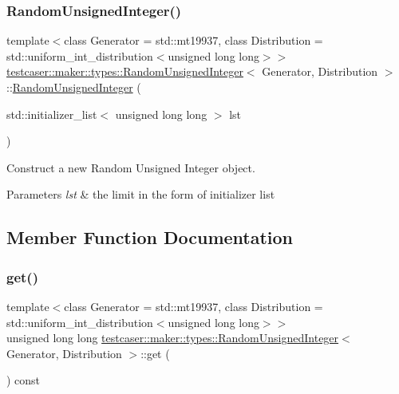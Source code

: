 \subsubsection{\texorpdfstring{RandomUnsignedInteger()}{RandomUnsignedInteger()}\hspace{0.1cm}{\footnotesize\ttfamily [3/3]}}
{\footnotesize\ttfamily template$<$class Generator = std\+::mt19937, class Distribution = std\+::uniform\+\_\+int\+\_\+distribution$<$unsigned long long$>$$>$ \\
\mbox{\hyperlink{classtestcaser_1_1maker_1_1types_1_1RandomUnsignedInteger}{testcaser\+::maker\+::types\+::\+Random\+Unsigned\+Integer}}$<$ Generator, Distribution $>$\+::\mbox{\hyperlink{classtestcaser_1_1maker_1_1types_1_1RandomUnsignedInteger}{Random\+Unsigned\+Integer}} (\begin{DoxyParamCaption}\item[{std\+::initializer\+\_\+list$<$ unsigned long long $>$}]{lst }\end{DoxyParamCaption})\hspace{0.3cm}{\ttfamily [inline]}}



Construct a new Random Unsigned Integer object. 


\begin{DoxyParams}{Parameters}
{\em lst} & the limit in the form of initializer list \\
\hline
\end{DoxyParams}


\subsection{Member Function Documentation}
\mbox{\label{classtestcaser_1_1maker_1_1types_1_1RandomUnsignedInteger_a73504939f740445d56b0bd00257f5480}} 
\subsubsection{\texorpdfstring{get()}{get()}}
{\footnotesize\ttfamily template$<$class Generator = std\+::mt19937, class Distribution = std\+::uniform\+\_\+int\+\_\+distribution$<$unsigned long long$>$$>$ \\
unsigned long long \mbox{\hyperlink{classtestcaser_1_1maker_1_1types_1_1RandomUnsignedInteger}{testcaser\+::maker\+::types\+::\+Random\+Unsigned\+Integer}}$<$ Generator, Distribution $>$\+::get (\begin{DoxyParamCaption}{ }\end{DoxyParamCaption}) const\hspace{0.3cm}{\ttfamily [inline]}}



